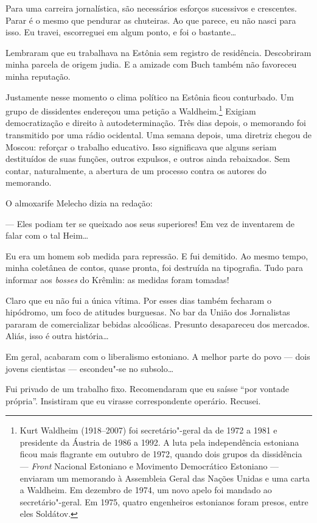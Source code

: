 Para uma carreira jornalística, são necessários esforços sucessivos e
crescentes. Parar é o mesmo que pendurar as chuteiras. Ao que parece, eu
não nasci para isso. Eu travei, escorreguei em algum ponto, e foi o
bastante\ldots{}

Lembraram que eu trabalhava na Estônia sem registro de residência.
Descobriram minha parcela de origem judia. E a amizade com Buch também
não favoreceu minha reputação.

Justamente nesse momento o clima político na Estônia ficou conturbado.
Um grupo de dissidentes endereçou uma petição a Waldheim.\footnote{Kurt
  Waldheim (1918--2007) foi secretário"-geral da  de 1972 a 1981 e
  presidente da Áustria de 1986 a 1992. A luta pela independência estoniana ficou mais flagrante em outubro de 1972, quando dois grupos da dissidência --- \emph{Front} Nacional Estoniano e Movimento Democrático Estoniano --- enviaram um memorando à Assembleia Geral das Nações Unidas e uma carta a Waldheim. Em dezembro de 1974, um novo apelo foi mandado ao secretário"-geral. Em 1975, quatro engenheiros estonianos foram presos, entre eles Soldátov.} Exigiam democratização e
direito à autodeterminação. Três dias depois, o memorando foi
transmitido por uma rádio ocidental. Uma semana depois, uma diretriz
chegou de Moscou: reforçar o trabalho educativo. Isso significava que
alguns seriam destituídos de suas funções, outros expulsos, e outros
ainda rebaixados. Sem contar, naturalmente, a abertura de um processo
contra os autores do memorando.

O almoxarife Melecho dizia na redação:

--- Eles podiam ter se queixado aos seus superiores! Em vez de
inventarem de falar com o tal Heim\ldots{}

Eu era um homem sob medida para repressão. E fui demitido. Ao mesmo
tempo, minha coletânea de contos, quase pronta, foi destruída na
tipografia. Tudo para informar aos \emph{bosses} do Krêmlin: as
medidas foram tomadas!

Claro que eu não fui a única vítima. Por esses dias também fecharam o
hipódromo, um foco de atitudes burguesas. No bar da União dos
Jornalistas pararam de comercializar bebidas alcoólicas. Presunto
desapareceu dos mercados. Aliás, isso é outra história\ldots{}

Em geral, acabaram com o liberalismo estoniano. A melhor parte do povo
--- dois jovens cientistas --- escondeu"-se no subsolo\ldots{}

Fui privado de um trabalho fixo. Recomendaram que eu saísse
``por vontade própria''. Insistiram que eu virasse correspondente operário.
Recusei.

